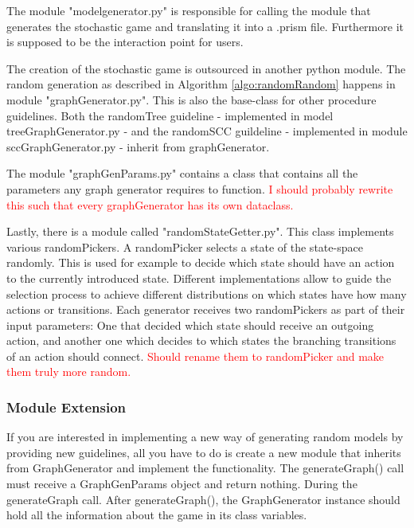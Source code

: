 The module "modelgenerator.py" is responsible for calling the module that generates the stochastic game and translating it into a .prism file. 
Furthermore it is supposed to be the interaction point for users.

The creation of the stochastic game is outsourced in another python module. The random generation as described in Algorithm \ref{algo:randomRandom} happens in
module "graphGenerator.py". This is also the base-class for other procedure guidelines. 
Both the randomTree guideline - implemented in model treeGraphGenerator.py - and the randomSCC guildeline - implemented in module sccGraphGenerator.py - inherit
from graphGenerator.

The module "graphGenParams.py" contains a class that contains all the parameters any graph generator requires to function. 
\textcolor{red}{I should probably rewrite this such that every graphGenerator has its own dataclass.}

Lastly, there is a module called "randomStateGetter.py". This class implements various randomPickers.
A randomPicker selects a state of the state-space randomly.
This is used for example to decide which state should have an action to the currently introduced state.
Different implementations allow to guide the selection process to achieve different distributions on which states have how many actions or transitions.
Each generator receives two randomPickers as part of their input parameters: One that decided which state should receive an outgoing action, 
and another one which decides to which states the branching transitions of an action should connect.
\textcolor{red}{Should rename them to randomPicker and make them truly more random.}

\subsubsection*{Module Extension}
If you are interested in implementing a new way of generating random models by providing new guidelines, all you have to do is create a new
module that inherits from GraphGenerator and implement the functionality. The generateGraph() call must receive a GraphGenParams object and return nothing.
During the generateGraph call. After generateGraph(), the GraphGenerator instance should hold all the information about the game in its class variables.